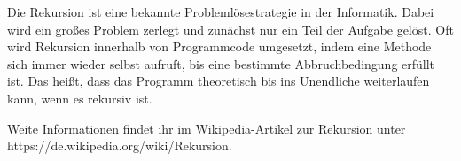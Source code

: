 Die Rekursion ist eine bekannte Problemlösestrategie in der Informatik. Dabei wird ein großes Problem zerlegt und zunächst nur ein Teil der Aufgabe gelöst. Oft wird Rekursion innerhalb von Programmcode umgesetzt, indem eine Methode sich immer wieder selbst aufruft, bis eine bestimmte Abbruchbedingung erfüllt ist. Das heißt, dass das Programm theoretisch bis ins Unendliche weiterlaufen kann, wenn es rekursiv ist. 

Weite Informationen findet ihr im Wikipedia-Artikel zur Rekursion unter https://de.wikipedia.org/wiki/Rekursion.